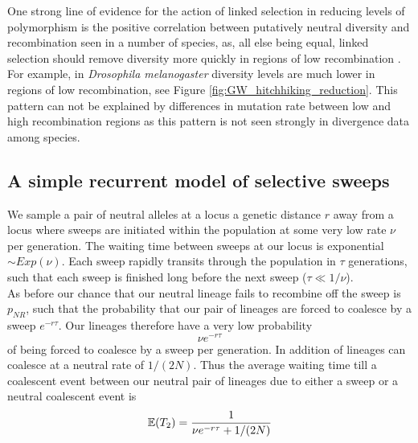 One strong line of evidence for the action of linked selection in reducing levels of
polymorphism is the positive correlation between putatively
neutral diversity and recombination seen in a number of species, as, all
else being equal, linked selection should remove diversity more quickly in regions of low recombination 
\citep{Aguade:89,Begun:92,Wiehe:93,Cutter:10,Hellmann:08,Cai:09,
  cutter2013}. For example, in {\it Drosophila melanogaster} diversity
levels are much lower in regions of low recombination, see
Figure \ref{fig:GW_hitchhiking_reduction}. This pattern can not be
explained by differences in mutation rate between low and high
recombination regions as this pattern is not seen strongly in
divergence data among species.


\subsection{A simple recurrent model of selective sweeps}
We sample a pair of neutral alleles at a locus a genetic distance $r$ away from a locus where
sweeps are initiated within the population at some very low rate $\nu$
per generation. The waiting time between sweeps
at our locus is exponential $\sim Exp(\nu)$. Each sweep rapidly transits through the population in $\tau$
generations, such that each sweep is finished long before the next
sweep ($\tau \ll 1/\nu$). \\

As before our chance that our neutral lineage fails to recombine
off the sweep is $p_{NR}$, such that the probability that
our pair of lineages are forced to coalesce by a sweep $e^{-r \tau}$. Our
lineages therefore have a very low probability
\begin{equation}
\nu e^{-r \tau}
\end{equation}
of being forced to coalesce by a sweep per generation. In addition of
lineages can coalesce at a neutral rate of $1/(2N)$. Thus the average
waiting time till a coalescent event between our neutral pair of
lineages due to either a sweep or a neutral coalescent event is
\begin{equation}
\mathbb{E}(T_2) = \frac{1}{\nu e^{-r \tau} + 1/(2N)}
\end{equation}

